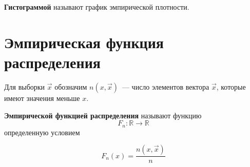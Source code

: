 \textbf{Гистограммой} называют график эмпирической плотности.


\section{Эмпирическая функция распределения}

Для выборки $\vec x$ обозначим $n(x, \vec x)$~--- число элементов вектора $\vec x$, которые имеют значения меньше $x$.

\textbf{Эмпирической функцией распределения} называют функцию
\begin{equation*}
    F_n : \mathbb{R} \to \mathbb{R}
\end{equation*}
определенную условием

\begin{equation*}
    F_n(x) = \frac{n(x, \vec x)}{n}
\end{equation*}


